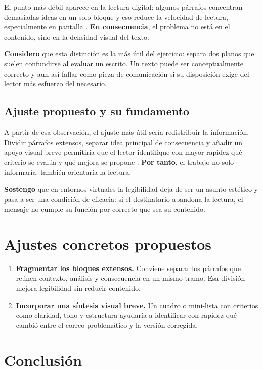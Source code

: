 \documentclass[
	spanish,
	letterpaper, oneside
]{article}
\begin{document}
El punto más débil aparece en la lectura digital: algunos párrafos concentran demasiadas ideas en un solo bloque y eso reduce la velocidad de lectura, especialmente en pantalla \citep{vitoriaEscrituraAcademicaFormacion2019}. \textbf{En consecuencia}, el problema no está en el contenido, sino en la densidad visual del texto.

\textbf{Considero} que esta distinción es la más útil del ejercicio: separa dos planos que suelen confundirse al evaluar un escrito. Un texto puede ser conceptualmente correcto y aun así fallar como pieza de comunicación si su disposición exige del lector más esfuerzo del necesario.

\subsection{Ajuste propuesto y su fundamento}

A partir de esa observación, el ajuste más útil sería redistribuir la información. Dividir párrafos extensos, separar idea principal de consecuencia y añadir un apoyo visual breve permitiría que el lector identifique con mayor rapidez qué criterio se evalúa y qué mejora se propone \citep{ayalaTallerLecturaRedaccion2010}. \textbf{Por tanto}, el trabajo no solo informaría: también orientaría la lectura.

\textbf{Sostengo} que en entornos virtuales la legibilidad deja de ser un asunto estético y pasa a ser una condición de eficacia: si el destinatario abandona la lectura, el mensaje no cumple su función por correcto que sea su contenido.

\section{Ajustes concretos propuestos}

\begin{enumerate}
	\item \textbf{Fragmentar los bloques extensos.} Conviene separar los párrafos que reúnen contexto, análisis y consecuencia en un mismo tramo. Esa división mejora legibilidad sin reducir contenido.
	\item \textbf{Incorporar una síntesis visual breve.} Un cuadro o mini-lista con criterios como claridad, tono y estructura ayudaría a identificar con rapidez qué cambió entre el correo problemático y la versión corregida.
\end{enumerate}

\section{Conclusión}
\end{document}
